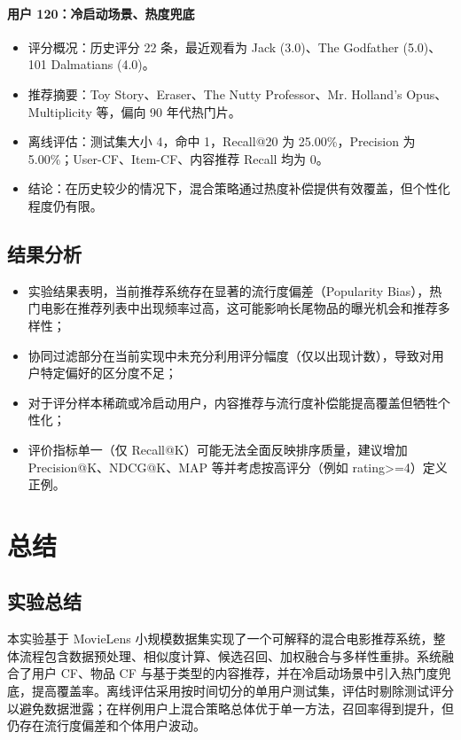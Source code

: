 \subsubsection{用户 120：冷启动场景、热度兜底}
\begin{itemize}
  \item 评分概况：历史评分 22 条，最近观看为 Jack (3.0)、The Godfather (5.0)、101 Dalmatians (4.0)。
  \item 推荐摘要：Toy Story、Eraser、The Nutty Professor、Mr. Holland's Opus、Multiplicity 等，偏向 90 年代热门片。
  \item 离线评估：测试集大小 4，命中 1，Recall@20 为 25.00\%，Precision 为 5.00\%；User-CF、Item-CF、内容推荐 Recall 均为 0。
  \item 结论：在历史较少的情况下，混合策略通过热度补偿提供有效覆盖，但个性化程度仍有限。
\end{itemize}


\section{结果分析}
\begin{itemize}
  \item 实验结果表明，当前推荐系统存在显著的流行度偏差（Popularity Bias），热门电影在推荐列表中出现频率过高，这可能影响长尾物品的曝光机会和推荐多样性；
  \item 协同过滤部分在当前实现中未充分利用评分幅度（仅以出现计数），导致对用户特定偏好的区分度不足；
  \item 对于评分样本稀疏或冷启动用户，内容推荐与流行度补偿能提高覆盖但牺牲个性化；
  \item 评价指标单一（仅 Recall@K）可能无法全面反映排序质量，建议增加 Precision@K、NDCG@K、MAP 等并考虑按高评分（例如 rating>=4）定义正例。
\end{itemize}


\chapter{总结}

\section{实验总结}
本实验基于 MovieLens 小规模数据集实现了一个可解释的混合电影推荐系统，整体流程包含数据预处理、相似度计算、候选召回、加权融合与多样性重排。系统融合了用户 CF、物品 CF 与基于类型的内容推荐，并在冷启动场景中引入热门度兜底，提高覆盖率。离线评估采用按时间切分的单用户测试集，评估时剔除测试评分以避免数据泄露；在样例用户上混合策略总体优于单一方法，召回率得到提升，但仍存在流行度偏差和个体用户波动。

